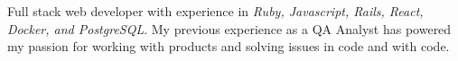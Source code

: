 \vspace{-1.0mm}

\begin{cvparagraph}

Full stack web developer with experience in \textit{Ruby, Javascript, Rails, React, Docker, and PostgreSQL}. My previous experience as a QA Analyst has powered my passion for working with products and solving issues in code and with code.\end{cvparagraph}
